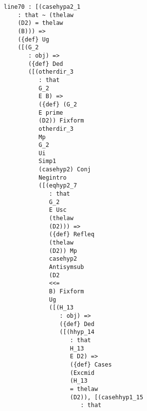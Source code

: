 \documentclass[12pt]{article}
\begin{document}
\begin{verbatim}
                              line70 : [(casehypa2_1 
                                  : that ~ (thelaw 
                                  (D2) = thelaw 
                                  (B))) => 
                                  ({def} Ug 
                                  ([(G_2 
                                     : obj) => 
                                     ({def} Ded 
                                     ([(otherdir_3 
                                        : that 
                                        G_2 
                                        E B) => 
                                        ({def} (G_2 
                                        E prime 
                                        (D2)) Fixform 
                                        otherdir_3 
                                        Mp 
                                        G_2 
                                        Ui 
                                        Simp1 
                                        (casehyp2) Conj 
                                        Negintro 
                                        ([(eqhyp2_7 
                                           : that 
                                           G_2 
                                           E Usc 
                                           (thelaw 
                                           (D2))) => 
                                           ({def} Refleq 
                                           (thelaw 
                                           (D2)) Mp 
                                           casehyp2 
                                           Antisymsub 
                                           (D2 
                                           <<= 
                                           B) Fixform 
                                           Ug 
                                           ([(H_13 
                                              : obj) => 
                                              ({def} Ded 
                                              ([(hhyp_14 
                                                 : that 
                                                 H_13 
                                                 E D2) => 
                                                 ({def} Cases 
                                                 (Excmid 
                                                 (H_13 
                                                 = thelaw 
                                                 (D2)), [(casehhyp1_15 
                                                    : that 

\end{verbatim}
\end{document}
